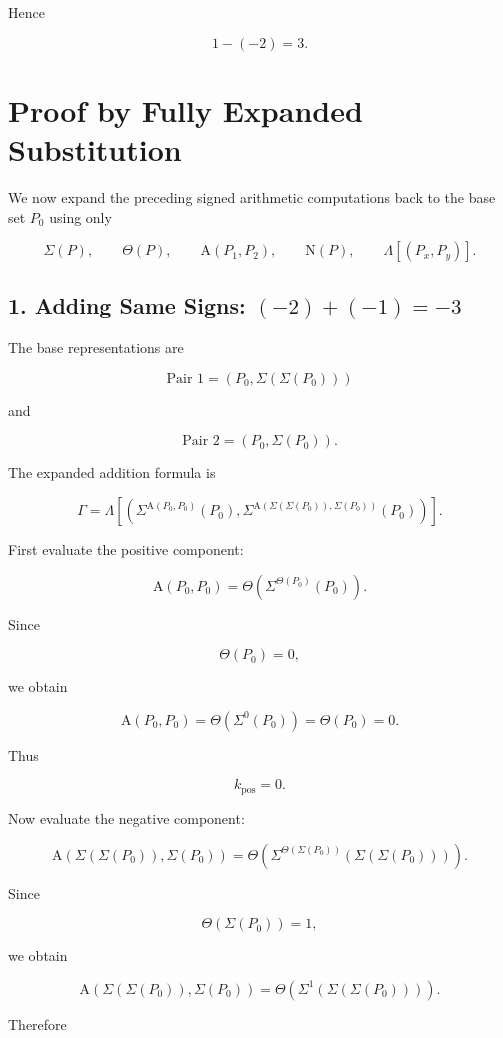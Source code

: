 \documentclass[12pt]{article}
\newcommand{\Alpha}{\mathrm{A}}
\newcommand{\Nu}{\mathrm{N}}
\begin{document}
Hence

\[
\boxed{
1-(-2)=3.
}
\]

\section*{Proof by Fully Expanded Substitution}

We now expand the preceding signed arithmetic computations back to the base set \(P_0\) using only

\[
\Sigma(P),\qquad
\Theta(P),\qquad
\Alpha(P_1,P_2),\qquad
\Nu(P),\qquad
\Lambda[(P_x,P_y)].
\]

\subsection*{1. Adding Same Signs: \((-2)+(-1)=-3\)}

The base representations are

\[
\text{Pair 1}
=
(P_0,\Sigma(\Sigma(P_0)))
\]

and

\[
\text{Pair 2}
=
(P_0,\Sigma(P_0)).
\]

The expanded addition formula is

\[
\Gamma
=
\Lambda\left[
\left(
\Sigma^{\Alpha(P_0,P_0)}(P_0),
\Sigma^{\Alpha(\Sigma(\Sigma(P_0)),\Sigma(P_0))}(P_0)
\right)
\right].
\]

First evaluate the positive component:

\[
\Alpha(P_0,P_0)
=
\Theta\left(
\Sigma^{\Theta(P_0)}(P_0)
\right).
\]

Since

\[
\Theta(P_0)=0,
\]

we obtain

\[
\Alpha(P_0,P_0)
=
\Theta(\Sigma^0(P_0))
=
\Theta(P_0)
=
0.
\]

Thus

\[
k_{\mathrm{pos}}=0.
\]

Now evaluate the negative component:

\[
\Alpha(\Sigma(\Sigma(P_0)),\Sigma(P_0))
=
\Theta\left(
\Sigma^{\Theta(\Sigma(P_0))}(\Sigma(\Sigma(P_0)))
\right).
\]

Since

\[
\Theta(\Sigma(P_0))=1,
\]

we obtain

\[
\Alpha(\Sigma(\Sigma(P_0)),\Sigma(P_0))
=
\Theta\left(
\Sigma^1(\Sigma(\Sigma(P_0)))
\right).
\]

Therefore
\end{document}
